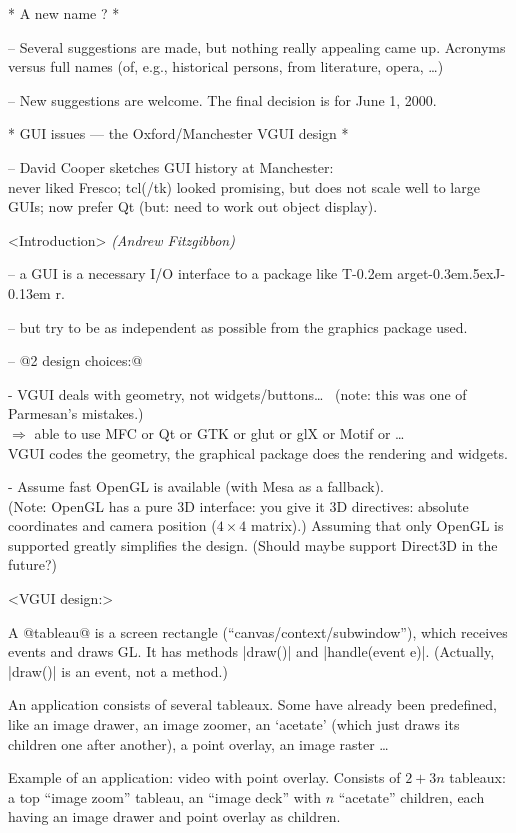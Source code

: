\documentclass[11pt]{article}
\def\TargetJr{{T\kern-0.2em arget\kern-0.3em\lower.5ex\hbox{\Large J}\kern-0.13em r}}
\def\by#1.{{\normalsize\sf\it(#1)}}\relax
\begin{document}
* A new name ? *

-- Several suggestions are made, but nothing really appealing came up.
Acronyms versus full names (of, e.g., historical persons, from literature,
opera, \ldots)

-- New suggestions are welcome.  The final decision is for June 1, 2000.


* GUI issues --- the Oxford/Manchester VGUI design *

-- David Cooper sketches GUI history at Manchester: \\
never liked Fresco; tcl(/tk) looked promising, but does not scale well to
large GUIs; now prefer Qt (but: need to work out object display).

<Introduction> \by Andrew Fitzgibbon.

-- a GUI is a necessary I/O interface to a package like \TargetJr.

-- but try to be as independent as possible from the graphics package used.

-- @2 design choices:@

- VGUI deals with geometry, not widgets/buttons\ldots
~(note: this was one of Parmesan's mistakes.)\\
$\Rightarrow$ able to use MFC or Qt or GTK or glut or glX or Motif or \ldots \\
VGUI codes the geometry, the graphical package does the rendering and widgets.

- Assume fast OpenGL is available (with Mesa as a fallback). \\
(Note: OpenGL has a pure 3D interface: you give it 3D directives: absolute
coordinates and camera position ($4\times4$ matrix).)
Assuming that only OpenGL is supported greatly simplifies the design.
(Should maybe support Direct3D in the future?)

<VGUI design:>

A @tableau@ is a screen rectangle (``canvas/context/subwindow''), which
receives events and draws GL.  It has methods |draw()| and |handle(event e)|.
(Actually, |draw()| is an event, not a method.)

An application consists of several tableaux.  Some have already been
predefined, like an image drawer, an image zoomer, an `acetate' (which just
draws its children one after another), a point overlay, an image raster \ldots

Example of an application: video with point overlay.  Consists of $2+3n$
tableaux: a top ``image zoom'' tableau, an ``image deck'' with $n$
``acetate'' children, each having an image drawer and point overlay as
children.
\end{document}
